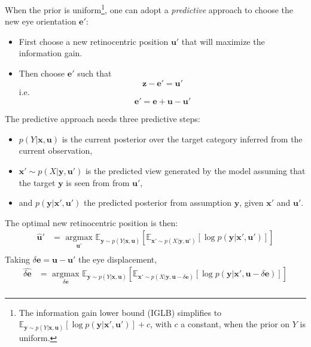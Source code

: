 When the prior is uniform\footnote{The information gain lower bound (IGLB) simplifies to $\mathbb{E}_{\boldsymbol{y}\sim p(Y|\boldsymbol{x}, \boldsymbol{u})} \left[\log p(\boldsymbol{y}|\boldsymbol{x}', \boldsymbol{u}')\right] + c$, with $c$ a constant, when the prior on $Y$ is uniform.}, one can adopt a \emph{predictive} approach to choose the new eye orientation $\boldsymbol{e}'$:
\begin{itemize}
	\item First choose a new retinocentric position $\boldsymbol{u}'$ that will maximize the  information gain.
	\item Then choose $\boldsymbol{e}'$ such that $$\boldsymbol{z} - \boldsymbol{e}' = \boldsymbol{u}'$$ i.e. $$\boldsymbol{e}' = \boldsymbol{e} + \boldsymbol{u} - \boldsymbol{u}'$$
\end{itemize}

The predictive approach needs three predictive steps:
\begin{itemize}
	\item $p(Y|\boldsymbol{x}, \boldsymbol{u})$ is the current posterior over the target category inferred from the current observation,
	\item $\boldsymbol{x}'\sim p(X|\boldsymbol{y},\boldsymbol{u}')$ is the predicted view generated by the model assuming that the target $\boldsymbol{y}$ is seen from from $\boldsymbol{u}'$,
	\item and $p(\boldsymbol{y}|\boldsymbol{x}', \boldsymbol{u}')$ the predicted posterior from   assumption $\boldsymbol{y}$, given $\boldsymbol{x}'$ and $\boldsymbol{u}'$.
\end{itemize}

The optimal new retinocentric position is then:
\begin{align*}
\hat{\boldsymbol{u}}' &= \underset{\boldsymbol{u}' }{\text{ argmax }} 
 \mathbb{E}_{\boldsymbol{y}\sim p(Y|\boldsymbol{x}, \boldsymbol{u})}  
 \left[\mathbb{E}_{ \boldsymbol{x}' \sim p(X|\boldsymbol{y}, \boldsymbol{u}')}
 \left[\log p(\boldsymbol{y}|\boldsymbol{x}', \boldsymbol{u}')\right]\right]\\
\end{align*}
Taking $\delta \boldsymbol{e} = \boldsymbol{u} - \boldsymbol{u}'$ the eye displacement, 
\begin{align*}
\widehat{\delta\boldsymbol{e}} &= \underset{\delta\boldsymbol{e} }{\text{ argmax }} 
\mathbb{E}_{\boldsymbol{y}\sim p(Y|\boldsymbol{x}, \boldsymbol{u})}  
\left[\mathbb{E}_{ \boldsymbol{x}' \sim p(X|\boldsymbol{y}, \boldsymbol{u}- \delta \boldsymbol{e})}
\left[\log p(\boldsymbol{y}|\boldsymbol{x}', \boldsymbol{u}-\delta\boldsymbol{e})\right]\right]\\
\end{align*}



